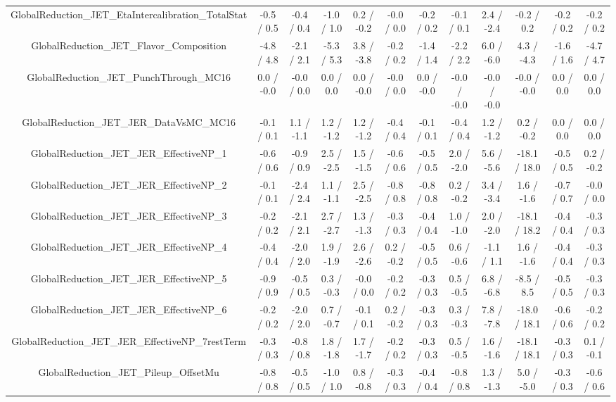 \begin{table}[htbp]
\begin{center}
\begin{tabular}{|c|c|c|c|c|c|c|c|c|c|c|c|}
  GlobalReduction_JET_EtaIntercalibration_TotalStat & -0.5 / 0.5 & -0.4 / 0.4 & -1.0 / 1.0 & 0.2 / -0.2 & -0.0 / 0.0 & -0.2 / 0.2 & -0.1 / 0.1 & 2.4 / -2.4 & -0.2 / 0.2 & -0.2 / 0.2 & -0.2 / 0.2 \\ 
  GlobalReduction_JET_Flavor_Composition & -4.8 / 4.8 & -2.1 / 2.1 & -5.3 / 5.3 & 3.8 / -3.8 & -0.2 / 0.2 & -1.4 / 1.4 & -2.2 / 2.2 & 6.0 / -6.0 & 4.3 / -4.3 & -1.6 / 1.6 & -4.7 / 4.7 \\ 
  GlobalReduction_JET_PunchThrough_MC16 & 0.0 / -0.0 & -0.0 / 0.0 & 0.0 / 0.0 & 0.0 / -0.0 & -0.0 / 0.0 & 0.0 / -0.0 & -0.0 / -0.0 & -0.0 / -0.0 & -0.0 / -0.0 & 0.0 / 0.0 & 0.0 / 0.0 \\ 
  GlobalReduction_JET_JER_DataVsMC_MC16 & -0.1 / 0.1 & 1.1 / -1.1 & 1.2 / -1.2 & 1.2 / -1.2 & -0.4 / 0.4 & -0.1 / 0.1 & -0.4 / 0.4 & 1.2 / -1.2 & 0.2 / -0.2 & 0.0 / 0.0 & 0.0 / 0.0 \\ 
  GlobalReduction_JET_JER_EffectiveNP_1 & -0.6 / 0.6 & -0.9 / 0.9 & 2.5 / -2.5 & 1.5 / -1.5 & -0.6 / 0.6 & -0.5 / 0.5 & 2.0 / -2.0 & 5.6 / -5.6 & -18.1 / 18.0 & -0.5 / 0.5 & 0.2 / -0.2 \\ 
  GlobalReduction_JET_JER_EffectiveNP_2 & -0.1 / 0.1 & -2.4 / 2.4 & 1.1 / -1.1 & 2.5 / -2.5 & -0.8 / 0.8 & -0.8 / 0.8 & 0.2 / -0.2 & 3.4 / -3.4 & 1.6 / -1.6 & -0.7 / 0.7 & -0.0 / 0.0 \\ 
  GlobalReduction_JET_JER_EffectiveNP_3 & -0.2 / 0.2 & -2.1 / 2.1 & 2.7 / -2.7 & 1.3 / -1.3 & -0.3 / 0.3 & -0.4 / 0.4 & 1.0 / -1.0 & 2.0 / -2.0 & -18.1 / 18.2 & -0.4 / 0.4 & -0.3 / 0.3 \\ 
  GlobalReduction_JET_JER_EffectiveNP_4 & -0.4 / 0.4 & -2.0 / 2.0 & 1.9 / -1.9 & 2.6 / -2.6 & 0.2 / -0.2 & -0.5 / 0.5 & 0.6 / -0.6 & -1.1 / 1.1 & 1.6 / -1.6 & -0.4 / 0.4 & -0.3 / 0.3 \\ 
  GlobalReduction_JET_JER_EffectiveNP_5 & -0.9 / 0.9 & -0.5 / 0.5 & 0.3 / -0.3 & -0.0 / 0.0 & -0.2 / 0.2 & -0.3 / 0.3 & 0.5 / -0.5 & 6.8 / -6.8 & -8.5 / 8.5 & -0.5 / 0.5 & -0.3 / 0.3 \\ 
  GlobalReduction_JET_JER_EffectiveNP_6 & -0.2 / 0.2 & -2.0 / 2.0 & 0.7 / -0.7 & -0.1 / 0.1 & 0.2 / -0.2 & -0.3 / 0.3 & 0.3 / -0.3 & 7.8 / -7.8 & -18.0 / 18.1 & -0.6 / 0.6 & -0.2 / 0.2 \\ 
  GlobalReduction_JET_JER_EffectiveNP_7restTerm & -0.3 / 0.3 & -0.8 / 0.8 & 1.8 / -1.8 & 1.7 / -1.7 & -0.2 / 0.2 & -0.3 / 0.3 & 0.5 / -0.5 & 1.6 / -1.6 & -18.1 / 18.1 & -0.3 / 0.3 & 0.1 / -0.1 \\ 
  GlobalReduction_JET_Pileup_OffsetMu & -0.8 / 0.8 & -0.5 / 0.5 & -1.0 / 1.0 & 0.8 / -0.8 & -0.3 / 0.3 & -0.4 / 0.4 & -0.8 / 0.8 & 1.3 / -1.3 & 5.0 / -5.0 & -0.3 / 0.3 & -0.6 / 0.6 \\ 

\end{tabular}
\end{center}
\end{table}
